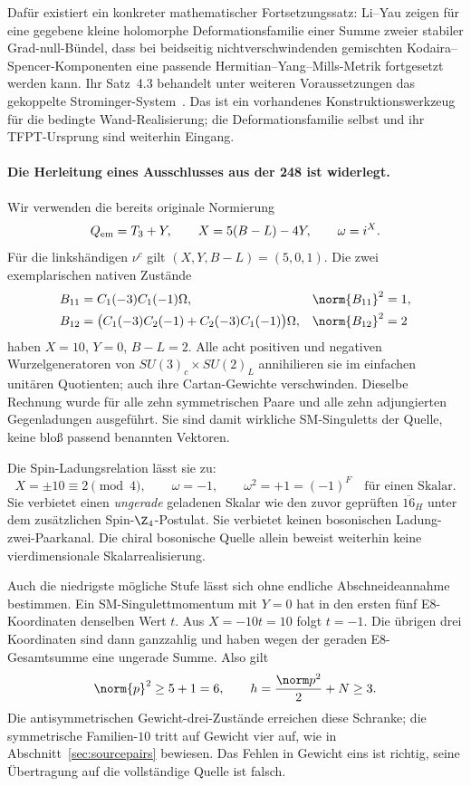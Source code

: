 Dafür existiert ein konkreter mathematischer Fortsetzungssatz: Li--Yau zeigen für eine gegebene kleine holomorphe Deformationsfamilie einer Summe zweier stabiler Grad-null-Bündel, dass bei beidseitig nichtverschwindenden gemischten Kodaira--Spencer-Komponenten eine passende Hermitian--Yang--Mills-Metrik fortgesetzt werden kann. Ihr Satz~4.3 behandelt unter weiteren Voraussetzungen das gekoppelte Strominger-System~\cite{liyautorsion}. Das ist ein vorhandenes Konstruktionswerkzeug für die bedingte Wand-Realisierung; die Deformationsfamilie selbst und ihr TFPT-Ursprung sind weiterhin Eingang.

\paragraph{Die Herleitung eines Ausschlusses aus der 248 ist widerlegt.}
Wir verwenden die bereits originale Normierung
\begin{equation}
Q_{\rm em}=T_3+Y,\qquad X=5(B-L)-4Y,\qquad \omega=i^X.
\end{equation}
Für die linkshändigen $\nu^c$ gilt $(X,Y,B-L)=(5,0,1)$. Die zwei exemplarischen nativen Zustände
\begin{align}
B_{11}&=C_1(-3)C_1(-1)\Omega,& \norm{B_{11}}^2&=1,\\
B_{12}&=\bigl(C_1(-3)C_2(-1)+C_2(-3)C_1(-1)\bigr)\Omega,
&\norm{B_{12}}^2&=2
\end{align}
haben $X=10$, $Y=0$, $B-L=2$. Alle acht positiven und negativen Wurzelgeneratoren von $SU(3)_c\times SU(2)_L$ annihilieren sie im einfachen unitären Quotienten; auch ihre Cartan-Gewichte verschwinden. Dieselbe Rechnung wurde für alle zehn symmetrischen Paare und alle zehn adjungierten Gegenladungen ausgeführt. Sie sind damit wirkliche SM-Singuletts der Quelle, keine bloß passend benannten Vektoren.

Die Spin-Ladungsrelation lässt sie zu:
\begin{equation}
X=\pm10\equiv2\pmod4,\qquad \omega=-1,\qquad
\omega^2=+1=(-1)^F\quad\text{für einen Skalar}.
\end{equation}
Sie verbietet einen \emph{ungerade} geladenen Skalar wie den zuvor geprüften $\overline{16}_H$ unter dem zusätzlichen Spin-$\Z_4$-Postulat. Sie verbietet keinen bosonischen Ladung-zwei-Paarkanal. Die chiral bosonische Quelle allein beweist weiterhin keine vierdimensionale Skalarrealisierung.

Auch die niedrigste mögliche Stufe lässt sich ohne endliche Abschneideannahme bestimmen. Ein SM-Singulettmomentum mit $Y=0$ hat in den ersten fünf E8-Koordinaten denselben Wert $t$. Aus $X=-10t=10$ folgt $t=-1$. Die übrigen drei Koordinaten sind dann ganzzahlig und haben wegen der geraden E8-Gesamtsumme eine ungerade Summe. Also gilt
\begin{equation}
\norm{p}^2\ge5+1=6,\qquad h=\frac{\norm p^2}{2}+N\ge3.
\end{equation}
Die antisymmetrischen Gewicht-drei-Zustände erreichen diese Schranke; die symmetrische Familien-$10$ tritt auf Gewicht vier auf, wie in Abschnitt~\ref{sec:sourcepairs} bewiesen. Das Fehlen in Gewicht eins ist richtig, seine Übertragung auf die vollständige Quelle ist falsch.

